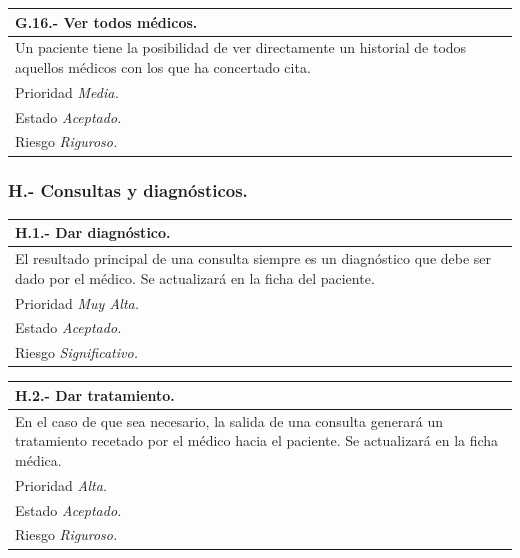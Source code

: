 \documentclass[a4paper,oneside,11pt]{book}
\begin{document}
\begin{center}
\begin{tabulary}{15cm}{|L|}
	\hline
		\bf{G.16.- Ver todos médicos.} \\
	\hline
		Un paciente tiene la posibilidad de ver directamente un historial de todos aquellos médicos con los que ha concertado cita. \\
	\hline
		Prioridad \textit{Media.} \\
	\hline
		Estado \textit{Aceptado.} \\
	\hline
		Riesgo \textit{Riguroso.} \\
	\hline
\end{tabulary}
\end{center}


\subsubsection{H.- Consultas y diagnósticos.}

\begin{center}
\begin{tabulary}{15cm}{|L|}
	\hline
		\bf{H.1.- Dar diagnóstico.} \\
	\hline
		El resultado principal de una consulta siempre es un diagnóstico que debe ser dado por el médico. Se actualizará en la ficha del paciente. \\
	\hline
		Prioridad \textit{Muy Alta.} \\
	\hline
		Estado \textit{Aceptado.} \\
	\hline
		Riesgo \textit{Significativo.} \\
	\hline
\end{tabulary}
\end{center}

\begin{center}
\begin{tabulary}{15cm}{|L|}
	\hline
		\bf{H.2.- Dar tratamiento.} \\
	\hline
		En el caso de que sea necesario, la salida de una consulta generará un tratamiento recetado por el médico hacia el paciente. Se actualizará en la ficha médica. \\
	\hline
		Prioridad \textit{Alta.} \\
	\hline
		Estado \textit{Aceptado.} \\
	\hline
		Riesgo \textit{Riguroso.} \\
	\hline
\end{tabulary}
\end{center}
\end{document}
